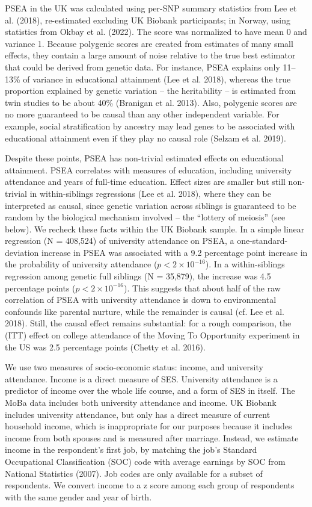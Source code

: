 \documentclass[
  12pt,
]{article}
\theoremstyle{definition}
\theoremstyle{definition}
\theoremstyle{definition}
\theoremstyle{definition}
\theoremstyle{remark}
\begin{document}
PSEA in the UK was calculated using per-SNP summary statistics from
{Lee et al.} (2018), re-estimated excluding UK Biobank participants; in Norway,
using statistics from {Okbay et al.} (2022). The score was normalized to
have mean 0 and variance 1. Because polygenic scores are created from
estimates of many small effects, they contain a large amount of noise
relative to the true best estimator that could be derived from genetic
data. For instance, PSEA explains only 11--13\% of variance in educational
attainment ({Lee et al.} 2018), whereas the true proportion explained by
genetic variation -- the heritability -- is estimated from twin studies
to be about 40\% (Branigan et al. 2013). Also, polygenic scores are no
more guaranteed to be causal than any other independent variable. For
example, social stratification by ancestry may lead genes to be
associated with educational attainment even if they play no causal role
(Selzam et al. 2019).

Despite these points, PSEA has non-trivial estimated effects on
educational attainment. PSEA correlates with measures of education,
including university attendance and years of full-time education. Effect
sizes are smaller but still non-trivial in within-siblings regressions
({Lee et al.} 2018), where they can be interpreted as causal, since genetic
variation across siblings is guaranteed to be random by the biological
mechanism involved -- the ``lottery of meiosis'' (see below). We recheck
these facts within the UK Biobank sample. In a simple linear regression
(N = 408,524) of university attendance on PSEA, a
one-standard-deviation increase in PSEA was associated with a
9.2 percentage point increase in the
probability of university attendance (\(p < 2 \times 10^{-16}\)). In a
within-siblings regression among genetic full siblings (N =
35,879), the increase was
4.5 percentage points (\(p < 2 \times
10^{-16}\)). This suggests that about half of the raw correlation of PSEA
with university attendance is down to environmental confounds like
parental nurture, while the remainder is causal (cf. {Lee et al.} 2018).
Still, the causal effect remains substantial: for a rough comparison,
the (ITT) effect on college attendance of the Moving To Opportunity
experiment in the US was 2.5 percentage points (Chetty et al. 2016).

We use two measures of socio-economic status: income, and university
attendance. Income is a direct measure of SES. University attendance is
a predictor of income over the whole life course, and a form of SES in
itself. The MoBa data includes both university attendance and income. UK
Biobank includes university attendance, but only has a direct measure of
current household income, which is inappropriate for our purposes
because it includes income from both spouses and is measured after
marriage. Instead, we estimate income in the respondent's first job, by
matching the job's Standard Occupational Classification (SOC) code with
average earnings by SOC from National Statistics (2007). Job codes are only available
for a subset of respondents. We convert income to a z score among each
group of respondents with the same gender and year of birth.
\end{document}
